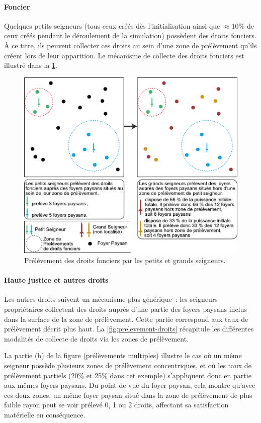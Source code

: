 \paragraph{Foncier}

Quelques petits seigneurs (tous ceux créés dès l'initialisation ainsi que $\approx 10\%$ de ceux créés pendant le déroulement de la simulation) possèdent des droits fonciers.
À ce titre, ils peuvent collecter ces droits au sein d'une zone de prélèvement qu'ils créent lors de leur apparition.
Le mécanisme de collecte des droits fonciers est illustré dans la \cref{fig:prelevement-fonciers}.
\begin{figure}[H]
	\centering
	\includegraphics[width=0.8\linewidth]{img/prelevements_foncier.pdf}
	\caption{Prélèvement des droits fonciers par les petits et grands seigneurs.}
	\label{fig:prelevement-fonciers}
\end{figure}

\paragraph{Haute justice et autres droits}

Les autres droits suivent un mécanisme plus générique : les seigneurs propriétaires collectent des droits auprès d'une partie des foyers paysans inclus dans la surface de la zone de prélèvement.
Cette partie correspond aux \og taux de prélèvement\fg{} décrit plus haut. La \cref{fig:prelevement-droits} récapitule les différentes modalités de collecte de droits via les zones de prélèvement.

La partie (b) de la figure (prélèvements multiples) illustre le cas où un même seigneur possède plusieurs zones de prélèvement concentriques, et où les taux de prélèvement partiels (20\% et 25\% dans cet exemple) s'appliquent donc en partie aux mêmes foyers paysans.
Du point de vue du foyer paysan, cela montre qu'avec ces deux zones, un même foyer paysan situé dans la zone de prélèvement de plus faible rayon peut se voir prélevé 0, 1 ou 2 droits, affectant sa satisfaction matérielle en conséquence.

